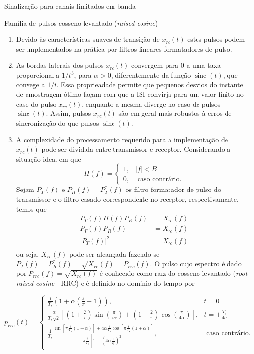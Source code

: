 \documentclass[
  ignorenonframetext,
]{beamer}
\begin{document}
\begin{frame}{Sinalização para canais limitados em banda}
\begin{block}{Família de pulsos cosseno levantado (\emph{raised
cosine})}
\begin{enumerate}
\item
  Devido às características suaves de transição de \(x_{rc}(t)\) estes
  pulsos podem ser implementados na prática por filtros lineares
  formatadores de pulso.
\item
  As bordas laterais dos pulsos \(x_{rc}(t)\) convergem para 0 a uma
  taxa proporcional a \(1/t^3\), para \(\alpha>0\), diferentemente da
  função \(\operatorname{sinc}(t)\), que convege a \(1/t\). Essa
  proprieadade permite que pequenos desvios do instante de amostragem
  ótimo façam com que a ISI convirja para um valor finito no caso do
  pulso \(x_{rc}(t)\), enquanto a mesma diverge no caso de pulsos
  \(\operatorname{sinc}(t)\). Assim, pulsos \(x_{rc}(t)\) são em geral
  mais robustos à erros de sincronização do que pulsos
  \(\operatorname{sinc}(t)\).
\item
  A complexidade do processamento requerido para a implementação de
  \(x_{rc}(t)\) pode ser dividida entre transmissor e receptor.
  Considerando a situação ideal em que \begin{equation}\nonumber
  H(f) = \begin{cases}1, & |f|<B \\ 0, & \text { caso contrário.}\end{cases}
  \end{equation}Sejam \(P_T(f)\) e \(P_R(f) = P_T^*(f)\) os filtro formatador de
  pulso do transmissor e o filtro casado correspondente no receptor,
  respectivamente, temos que\[
  \begin{align}
  P_T(f)H(f)P_R(f) &= X_{rc}(f)\nonumber\\
  P_T(f)P_R(f) &= X_{rc}(f)\nonumber\\
  |P_T(f)|^2 &= X_{rc}(f)\nonumber\\
  \end{align}
  \] ou seja, \(X_{rc}(f)\) pode ser alcançada fazendo-se
  \(P_T(f) = P_R^*(f) = \sqrt{X_{rc}(f)} = P_{rrc}(f)\). O pulso cujo
  espectro é dado por \(P_{rrc}(f) = \sqrt{X_{rc}(f)}\) é conhecido como
  raiz do cosseno levantado (\emph{root raised cosine} - RRC) e é
  definido no domínio do tempo por
\end{enumerate}

\[
p_{rrc}(t)= \begin{cases}\frac{1}{T_s}\left(1+\alpha\left(\frac{4}{\pi}-1\right)\right), & t=0 \\ \frac{\alpha}{T_s \sqrt{2}}\left[\left(1+\frac{2}{\pi}\right) \sin \left(\frac{\pi}{4 \alpha}\right)+\left(1-\frac{2}{\pi}\right) \cos \left(\frac{\pi}{4 \alpha}\right)\right], & t= \pm \frac{T_s}{4 \alpha} \\ \frac{1}{T_s} \frac{\sin \left[\pi \frac{t}{T_s}(1-\alpha)\right]+4 \alpha \frac{t}{T_s} \cos \left[\pi \frac{t}{T_s}(1+\alpha)\right]}{\pi \frac{t}{T_s}\left[1-\left(4 \alpha \frac{t}{T_s}\right)^2\right]}, & \text { caso contrário.}\end{cases}
\]
\end{block}


\end{frame}
\end{document}
